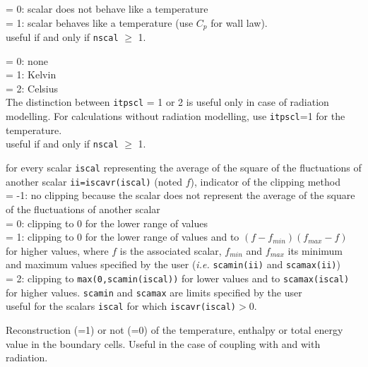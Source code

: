 {\hspace*{1.3cm}= 0: scalar does not behave like a temperature\\
\hspace*{1.3cm}= 1: scalar behaves like a temperature
(use $C_p$ for wall law).\\
useful if and only if {\tt nscal} $\geqslant$ 1.}

{\hspace*{1.3cm}= 0: none\\
\hspace*{1.3cm}= 1: Kelvin\\
\hspace*{1.3cm}= 2: Celsius\\
The distinction between {\tt itpscl} = 1 or 2 is useful only in case of
radiation modelling. For calculations without radiation modelling,
use {\tt itpscl}=1 for the temperature.\\
useful if and only if {\tt nscal} $\geqslant$ 1.}

{for every scalar {\tt iscal} representing the average of the square of the
fluctuations of another scalar {\tt ii=iscavr(iscal)} (noted $f$),
indicator of the clipping method\\
\hspace*{1.3cm}= -1: no clipping because the scalar does not represent
the average of the square of the fluctuations of another scalar\\
\hspace*{1.3cm}= 0: clipping to 0 for the lower range of values\\
\hspace*{1.3cm}= 1: clipping to 0 for the lower range of values and to
\mbox{$(f-f_{min})(f_{max}-f)$} for higher values, where $f$ is
the associated scalar, $f_{min}$ and $f_{max}$ its minimum and maximum
values specified by the user ({\em i.e.} {\tt scamin(ii)} and {\tt scamax(ii)}) \\
\hspace*{1.3cm}= 2: clipping to {\tt max(0,scamin(iscal))} for lower
values and to {\tt scamax(iscal)} for higher values. {\tt scamin} and {\tt scamax}
are limits specified by the user\\
useful for the scalars {\tt iscal} for which {\tt iscavr(iscal)}$>$0.}

{Reconstruction (=1) or not (=0) of the temperature, enthalpy or total energy
value in the boundary cells. Useful in the case of coupling with \syrthes
and with radiation.}

